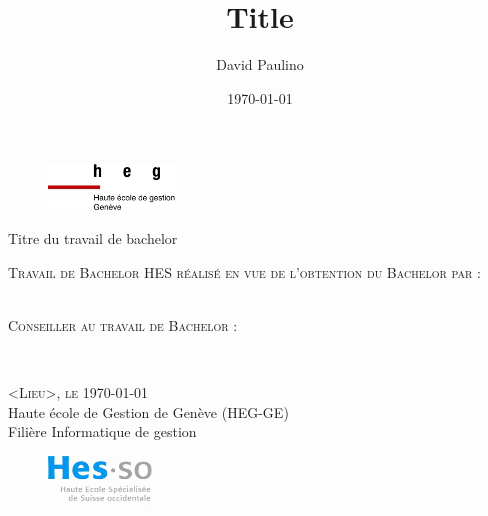 \documentclass[12pt]{article}
\title{Title}
\author{David Paulino}
\date{\today}
\begin{document}
\begin{titlepage}

    \begin{figure}[h]
        \includegraphics[width=0.3\textwidth]{img/logo_heg-ge.jpg}
    \end{figure}

    \vspace*{0.5cm}
    
    \begin{center}

    \begingroup \linespread{1,75} \selectfont 
    {\Large Titre du travail de bachelor}\\[0,75cm]
     \endgroup


    
    \vspace{1.5cm}

    \textsc{\large Travail de Bachelor HES réalisé en vue de \newline l’obtention du Bachelor par :}\\[0,50cm] 

      \begingroup \linespread{1,75} \selectfont 
      \textsc{}\\[0,50cm]
      \endgroup

    
    \vspace{1cm}


        \textsc{\large Conseiller au travail de Bachelor : }

        \begingroup \linespread{1,75} \selectfont 
        \textsc{}\\[1cm]
        \endgroup


        \begingroup \linespread{1,75} \selectfont 
            \textsc{\large <Lieu>, le \today}\\[0,25cm]
       
            {\large Haute école de Gestion de Genève (HEG-GE)}\\[0,25cm]

            {\large Filière Informatique de gestion}\\[0,25cm]
        \endgroup



        \begin{figure}[h]
            \vspace*{1cm}
            \hspace*{12cm}\includegraphics[width=0.25\textwidth]{img/logo_hes-so.jpg}
        \end{figure}

    \end{center}



            \vfill
\end{titlepage}
\end{document}
